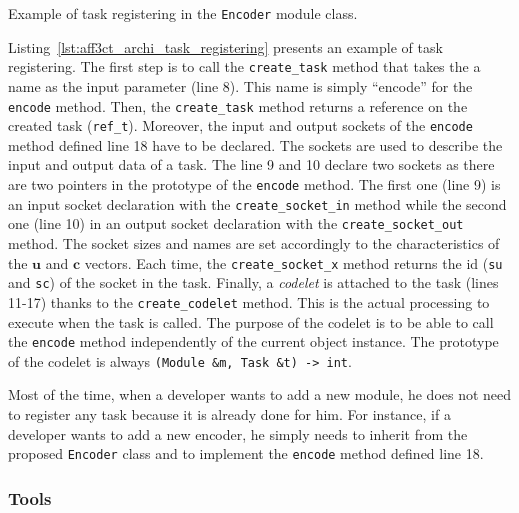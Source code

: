 \begin{listing}[htp]
  \inputminted[frame=lines,linenos]{C++}{main/chapter4/src/archi/task_registering.cpp}
  \caption{Example of task registering in the \texttt{Encoder} module class.}
  \label{lst:aff3ct_archi_task_registering}
\end{listing}

Listing~\ref{lst:aff3ct_archi_task_registering} presents an example of task
registering. The first step is to call the \verb|create_task| method that
takes the a name as the input parameter (line 8). This name is simply ``encode''
for the \verb|encode| method. Then, the \verb|create_task| method returns a
reference on the created task (\verb|ref_t|). Moreover, the input and output
sockets of the \verb|encode| method defined line 18 have to be declared. The
sockets are used to describe the input and output data of a task. The line 9 and
10 declare two sockets as there are two pointers in the prototype of the
\verb|encode| method. The first one (line 9) is an input socket declaration with
the \verb|create_socket_in| method while the second one (line 10) in an output
socket declaration with the \verb|create_socket_out| method. The socket sizes
and names are set accordingly to the characteristics of the $\bm{u}$ and
$\bm{c}$ vectors. Each time, the \verb|create_socket_x| method returns the id
(\verb|su| and \verb|sc|) of the socket in the task. Finally, a \emph{codelet}
is attached to the task (lines 11-17) thanks to the \verb|create_codelet|
method. This is the actual processing to execute when the task is called. The
purpose of the codelet is to be able to call the \verb|encode| method
independently of the current object instance. The prototype of the codelet is
always \verb|(Module &m, Task &t) -> int|.

Most of the time, when a developer wants to add a new module, he does not need
to register any task because it is already done for him. For instance, if a
developer wants to add a new encoder, he simply needs to inherit from the
proposed \verb|Encoder| class and to implement the \verb|encode| method defined
line 18.

\subsubsection{Tools}

